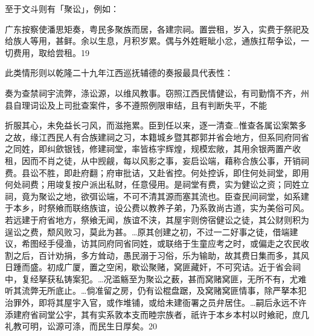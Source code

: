 至于文斗则有「聚讼」，例如：

\begin{BookQuote}
广东按察使潘思矩奏，粤民多聚族而居，各建宗祠。置尝租，岁入，实费于祭祀及给族人等用，甚鲜。余以生息，月积岁累。偶与外姓睚眦小忿，通族扛帮争讼，一切费用，取给尝租。19
\end{BookQuote}

此类情形则以乾隆二十九年江西巡抚辅德的奏报最具代表性：

\begin{BookQuote}
奏为查禁祠宇流弊，涤讼源，以维风教事。窃照江西民情健讼，有司勤惰不齐，州县自理词讼及上司批查案件，多不遵照例限审结，且有判断失平，不能
\end{BookQuote}

\vfill
\begin{BookNotes}
\end{BookNotes}

折服其心，未免益长刁风，而滋拖累。臣到任以来，逐一清查…惟查各属讼案繁多之故，缘江西民人有合族建祠之习，本籍城乡暨其郡郭并省会地方，但系同府同省之同姓，即纠歛银钱，修建祠堂，率皆栋宇辉煌，规模宏敞，其用余银两置产收租，因而不肖之徒，从中觊觎，每以风影之事，妄启讼端，藉称合族公事，开销祠费。县讼不胜，即赴府翻；府审批诘，又赴省控。何处控诉，即住何处祠堂，即用何处祠费；用竣复按户派出私财，任意侵用。是祠堂有费，实为健讼之资；同姓立祠，竟为聚讼之地，欲弭讼端，不可不清其源而塞其流也。臣查民间祠堂，如系建于本乡，时祭飨而联络族谊，设公费以教养子弟，乃系敦尚古道，实为美俗可风。若远建于府省地方，祭飨无闻，族谊不浃，其屋宇则傍宿健讼之徒，其公财则积为逞讼之费，颓风败习，莫此为甚。…原其创建之初，不过一二好事之徒，借端建议，希图经手侵渔，访其同府同省同姓，或联络于生童应考之时，或偏走之农民收割之后，百计劝捐，多方耸动，愚民溺于习俗，乐为输助，故其费日集而多，其风日踵而盛。初成广厦，置之空闲，歇讼聚赌，窝匪藏奸，不可究诘。近于省会祠中，复经拏获私铸案犯。…况滥觞至为聚讼之薮，甚而窝赌窝匪，无所不有，尤难听其流弊无所底止。…倘准留之房，仍有讼棍盘踞，及窝赌窝匪情事，除严拏本犯治罪外，即将其屋宇入官，或作堆铺，或给未建衙署之员弁居住。…嗣后永远不许添建府省祠堂公宇，其有实系敦本支而睦宗族者，祇许于本乡本村以时飨祀，庶几礼教可明，讼源可涤，而民生日厚矣。20

